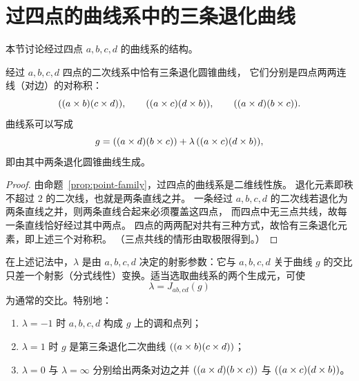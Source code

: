 \section{过四点的曲线系中的三条退化曲线}

本节讨论经过四点 $a,b,c,d$ 的曲线系的结构。

\begin{proposition}[三条退化曲线]\label{prop:three-degenerate}
经过 $a,b,c,d$ 四点的二次线系中恰有三条退化圆锥曲线，
它们分别是四点两两连线（对边）的对称积：
\[
((a\times b)(c\times d)),\qquad
((a\times c)(d\times b)),\qquad
((a\times d)(b\times c)) .
\]
曲线系可以写成
\[
g=((a\times d)(b\times c))+\lambda\,((a\times c)(d\times b)) ,
\]
即由其中两条退化圆锥曲线生成。
\end{proposition}

\begin{proof}
由命题~\ref{prop:point-family}，过四点的曲线系是二维线性族。
退化元素即秩不超过 $2$ 的二次线，也就是两条直线之并。
一条经过 $a,b,c,d$ 的二次线若退化为两条直线之并，则两条直线合起来必须覆盖这四点，
而四点中无三点共线，故每一条直线恰好经过其中两点。
四点的两两配对共有三种方式，故恰有三条退化元素，即上述三个对称积。
（三点共线的情形由取极限得到。）
\end{proof}

\begin{proposition}\label{prop:crossratio}
在上述记法中，$\lambda$ 是由 $a,b,c,d$ 决定的射影参数：它与 $a,b,c,d$ 关于曲线 $g$ 的交比
只差一个射影（分式线性）变换。适当选取曲线系的两个生成元，可使
\[
\lambda=J_{ab,cd}(g)
\]
为通常的交比。特别地：
\begin{enumerate}
\item $\lambda=-1$ 时 $a,b,c,d$ 构成 $g$ 上的调和点列；
\item $\lambda=1$ 时 $g$ 是第三条退化二次曲线 $((a\times b)(c\times d))$；
\item $\lambda=0$ 与 $\lambda=\infty$ 分别给出两条对边之并
$((a\times d)(b\times c))$ 与 $((a\times c)(d\times b))$。
\end{enumerate}
\end{proposition}

